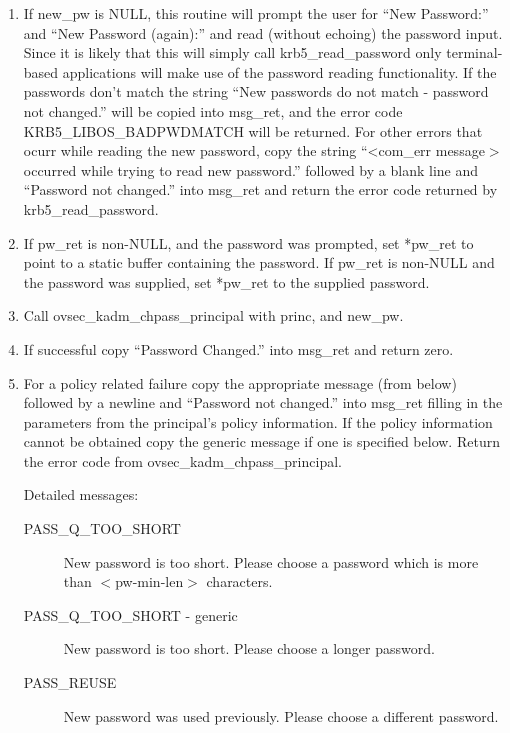 \begin{enumerate}
\item If new_pw is NULL, this routine will prompt the user for
``New Password:'' and ``New Password (again):'' and read (without
echoing) the password input. Since it is likely that this will simply
call krb5_read_password only terminal-based applications will make use
of the password reading functionality. If the passwords don't match
the string ``New passwords do not match - password not changed.'' will
be copied into msg_ret, and the error code KRB5_LIBOS_BADPWDMATCH will
be returned.  For other errors that ocurr while reading the new
password, copy the string ``<com_err message$>$ occurred while trying
to read new password.''  followed by a blank line and ``Password not
changed.'' into msg_ret and return the error code returned by
krb5_read_password.

\item If pw_ret is non-NULL, and the password was prompted, set *pw_ret to
point to a static buffer containing the password.  If pw_ret is non-NULL
and the password was supplied, set *pw_ret to the supplied password.

\item Call ovsec_kadm_chpass_principal with princ, and new_pw.

\item If successful copy ``Password Changed.'' into msg_ret and return zero.

\item For a policy related failure copy the appropriate message (from below) 
followed by a newline and ``Password not changed.'' into msg_ret
filling in the parameters from the principal's policy information. If
the policy information cannot be obtained copy the generic message if
one is specified below. Return the error code from
ovsec_kadm_chpass_principal.

Detailed messages:
\begin{description}

\item[PASS_Q_TOO_SHORT]
New password is too short. Please choose a
password which is more than $<$pw-min-len$>$ characters.

\item[PASS_Q_TOO_SHORT - generic]
New password is too short. Please choose a longer password.

\item[PASS_REUSE]
New password was used previously. Please choose a
different password.


\end{description}
\end{enumerate}
